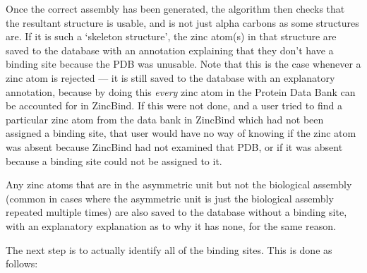 Once the correct assembly has been generated, the algorithm then checks that the resultant structure is usable, and is not just alpha carbons as some structures are. If it is such a `skeleton structure', the zinc atom(s) in that structure are saved to the database with an annotation explaining that they don't have a binding site because the PDB was unusable. Note that this is the case whenever a zinc atom is rejected --- it is still saved to the database with an explanatory annotation, because by doing this \emph{every} zinc atom in the Protein Data Bank can be accounted for in ZincBind. If this were not done, and a user tried to find a particular zinc atom from the data bank in ZincBind which had not been assigned a binding site, that user would have no way of knowing if the zinc atom was absent because ZincBind had not examined that PDB, or if it was absent because a binding site could not be assigned to it.

Any zinc atoms that are in the asymmetric unit but not the biological assembly (common in cases where the asymmetric unit is just the biological assembly repeated multiple times) are also saved to the database without a binding site, with an explanatory explanation as to why it has none, for the same reason.

The next step is to actually identify all of the binding sites. This is done as follows:

